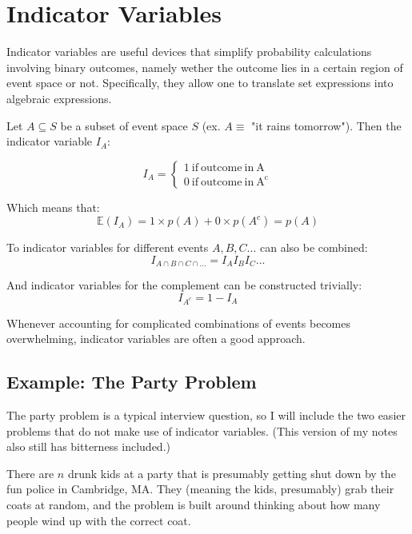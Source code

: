 \section{Indicator Variables}

Indicator variables are useful devices that simplify probability calculations involving binary outcomes, namely wether the outcome lies in a certain region of event space or not. Specifically, they allow one to translate set expressions into algebraic expressions. 

Let $A\subseteq S$ be a subset of event space $S$ (ex. $A\equiv$ "it rains tomorrow"). Then the indicator variable $I_A$: 

\begin{equation}
I_A = \left\{\begin{array}{l} 1 \mathrm{\ if\ outcome\ in\ A}\\0 \mathrm{\ if\ outcome\ in\ A^c} \end{array}\right.
\end{equation}

Which means that:
\begin{equation}
\mathbb{E}(I_A) = 1\times p(A) + 0\times p(A^c)= p(A)
\end{equation}

To indicator variables for different events $A,B,C...$ can also be combined:
\begin{equation}
I_{A\cap B\cap C\cap ...} = I_A I_B I_C ...
\end{equation}

And indicator variables for the complement can be constructed trivially:
\begin{equation}
I_{A^c} = 1 - I_A
\end{equation}

Whenever accounting for complicated combinations of events becomes overwhelming, indicator variables are often a good approach.

\subsection{Example: The Party Problem}

The party problem is a typical interview question, so I will include the two easier problems that do not make use of indicator variables. (This version of my notes also still has bitterness included.)

There are $n$ drunk kids at a party that is presumably getting shut down by the fun police in Cambridge, MA. They (meaning the kids, presumably) grab their coats at random, and the problem is built around thinking about how many people wind up with the correct coat.

